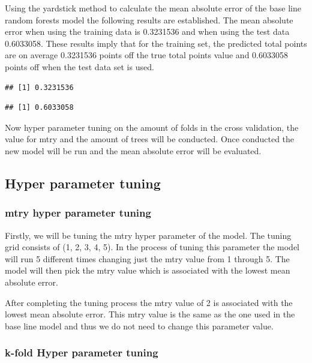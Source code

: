 \documentclass[11pt,preprint, authoryear]{elsarticle}
\numberwithin{equation}{section}
\numberwithin{figure}{section}
\numberwithin{table}{section}
\begin{document}
Using the yardstick method to calculate the mean absolute error of the
base line random forests model the following results are established.
The mean absolute error when using the training data is 0.3231536 and
when using the test data 0.6033058. These results imply that for the
training set, the predicted total points are on average 0.3231536 points
off the true total points value and 0.6033058 points off when the test
data set is used.

\begin{verbatim}
## [1] 0.3231536
\end{verbatim}

\begin{verbatim}
## [1] 0.6033058
\end{verbatim}

Now hyper parameter tuning on the amount of folds in the cross
validation, the value for mtry and the amount of trees will be
conducted. Once conducted the new model will be run and the mean
absolute error will be evaluated.

\hypertarget{hyper-parameter-tuning}{%
\subsection{Hyper parameter tuning}\label{hyper-parameter-tuning}}

\hypertarget{mtry-hyper-parameter-tuning}{%
\subsubsection{mtry hyper parameter
tuning}\label{mtry-hyper-parameter-tuning}}

Firstly, we will be tuning the mtry hyper parameter of the model. The
tuning grid consists of (1, 2, 3, 4, 5). In the process of tuning this
parameter the model will run 5 different times changing just the mtry
value from 1 through 5. The model will then pick the mtry value which is
associated with the lowest mean absolute error.

After completing the tuning process the mtry value of 2 is associated
with the lowest mean absolute error. This mtry value is the same as the
one used in the base line model and thus we do not need to change this
parameter value.

\hypertarget{k-fold-hyper-parameter-tuning}{%
\subsubsection{k-fold Hyper parameter
tuning}\label{k-fold-hyper-parameter-tuning}}
\end{document}
